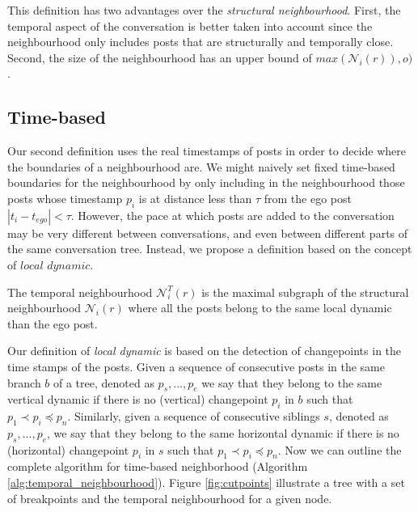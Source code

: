 \documentclass[9pt,technote]{IEEEtran}
\begin{document}
This definition has two advantages over the \textit{structural neighbourhood}. First, the temporal aspect of the conversation is better taken into account since the neighbourhood only includes posts that are structurally and temporally close. Second, the size of the neighbourhood has an upper bound of $max(\mathcal{N}_i(r)), o)$.

\subsection{Time-based}
Our second definition uses the real timestamps of posts in order to decide where the boundaries of a neighbourhood are. We might naively set fixed time-based boundaries for the neighbourhood by only including in the neighbourhood those posts whose timestamp $p_i$ is at distance less than $\tau$ from the ego post $|t_i-t_{ego}|<\tau$. However, the pace at which posts are added to the conversation may be very different between conversations, and even between different parts of the same conversation tree. Instead, we propose a definition based on the concept of $\textit{local dynamic}$. 

\begin{definition}
The temporal neighbourhood $\mathcal{N}_{i}^T(r)$ is the maximal subgraph of the structural neighbourhood $\mathcal{N}_i(r)$ where all the posts belong to the same local dynamic than the ego post.
\end{definition}
Our definition of \textit{local dynamic} is based on the detection of changepoints in the time stamps of the posts. Given a sequence of consecutive posts in the same branch $b$ of a tree, denoted as $p_s,...,p_e$ we say that they belong to the same vertical dynamic if there is no (vertical) changepoint $p_i$ in $b$ such that $p_1 \prec p_i \preceq p_n$. Similarly, given a sequence of consecutive siblings $s$, denoted as $p_s,...,p_e$, we say that they belong to the same horizontal dynamic if there is no (horizontal) changepoint $p_i$ in $s$ such that $p_1 \prec p_i \preceq p_n$. Now we can outline the complete algorithm for time-based neighborhood (Algorithm \ref{alg:temporal_neighbourhood}). Figure \ref{fig:cutpoints} illustrate a tree with a set of breakpoints and the temporal neighbourhood for a given node.
\end{document}
